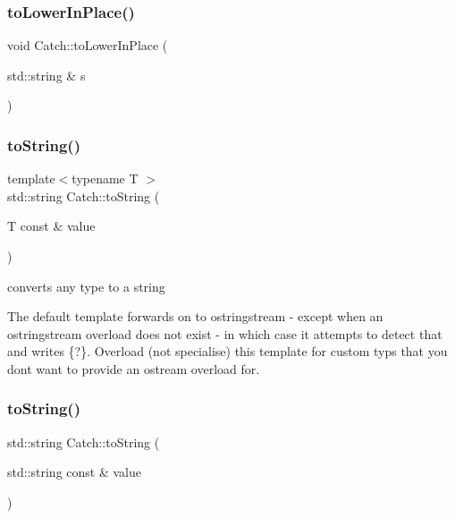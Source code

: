\mbox{\label{namespace_catch_a0760dbe87d090a55a35414db57d272c4}} 
\subsubsection{to\+Lower\+In\+Place()}
{\footnotesize\ttfamily void Catch\+::to\+Lower\+In\+Place (\begin{DoxyParamCaption}\item[{std\+::string \&}]{s }\end{DoxyParamCaption})}

\mbox{\label{namespace_catch_adbd1730f961da94d9ed284f70fd7a28b}} 
\subsubsection{to\+String()\hspace{0.1cm}{\footnotesize\ttfamily [1/17]}}
{\footnotesize\ttfamily template$<$typename T $>$ \\
std\+::string Catch\+::to\+String (\begin{DoxyParamCaption}\item[{T const \&}]{value }\end{DoxyParamCaption})}



converts any type to a string 

The default template forwards on to ostringstream -\/ except when an ostringstream overload does not exist -\/ in which case it attempts to detect that and writes \{?\}. Overload (not specialise) this template for custom typs that you don\textquotesingle{}t want to provide an ostream overload for. \mbox{\label{namespace_catch_ad6e969257437cf007b8b5017b22e570c}} 
\subsubsection{to\+String()\hspace{0.1cm}{\footnotesize\ttfamily [2/17]}}
{\footnotesize\ttfamily std\+::string Catch\+::to\+String (\begin{DoxyParamCaption}\item[{std\+::string const \&}]{value }\end{DoxyParamCaption})}

